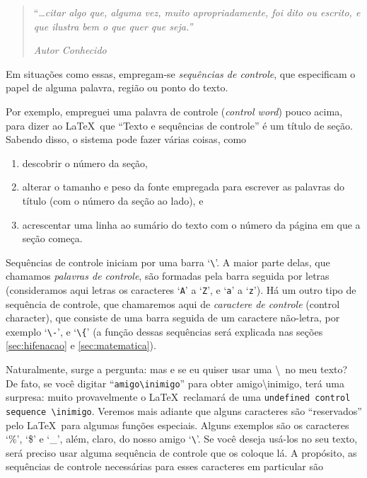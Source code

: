 \begin{quote}
  ``\ldots \textsl{citar algo que, alguma vez, muito apropriadamente, foi
    dito ou escrito, e que ilustra bem o que quer que seja.''}

  \hfill\textsl{Autor Conhecido}
\end{quote}

Em situações como essas, empregam-se \emph{sequências de controle},
que especificam o papel de alguma palavra, região ou ponto do texto.

Por exemplo, empreguei uma palavra de controle (\emph{control word\/})
pouco acima, para dizer ao \LaTeX\ que ``Texto e sequências de
controle'' é um título de seção. Sabendo disso,  o sistema pode fazer
várias coisas, como
\begin{enumerate}
\item descobrir o número da seção,
\item alterar o tamanho e peso da fonte empregada para escrever as
  palavras do título (com o número da seção ao lado), e
\item acrescentar uma linha ao sumário do texto com o número da página
  em que a seção começa.
\end{enumerate}

Sequências de controle iniciam por uma barra `\verb|\|'. A maior parte
delas, que chamamos \emph{palavras de controle}, são formadas pela
barra seguida por letras (consideramos aqui letras os
caracteres `\texttt{A}' a `\texttt{Z}', e `\texttt{a}' a
`\texttt{z}'). Há um outro tipo
de sequência de controle, que chamaremos aqui de \emph{caractere de controle}
(control character), que consiste de uma barra seguida de um caractere
não-letra, por exemplo `\verb|\-|', e `\verb|\{|' (a função dessas
sequências será explicada nas seções \ref{sec:hifenacao} e
\ref{sec:matematica}).

Naturalmente, surge a pergunta: mas e se eu quiser usar uma
\textbackslash\ no meu texto? De fato, se você digitar
``\verb|amigo\inimigo|'' para obter amigo\textbackslash inimigo, terá
uma surpresa: muito provavelmente o \LaTeX\ reclamará de uma
\verb!undefined control sequence \inimigo!. Veremos mais adiante que
alguns caracteres são ``reservados'' pelo \LaTeX\ para algumas funções
especiais. Alguns exemplos são os caracteres `\%', `\$' e `\_', além,
claro, do nosso amigo `\verb|\|'. Se você deseja usá-los no seu texto,
será preciso usar alguma sequência de controle que os coloque lá. A
propósito, as sequências de controle necessárias para esses caracteres
em particular são

